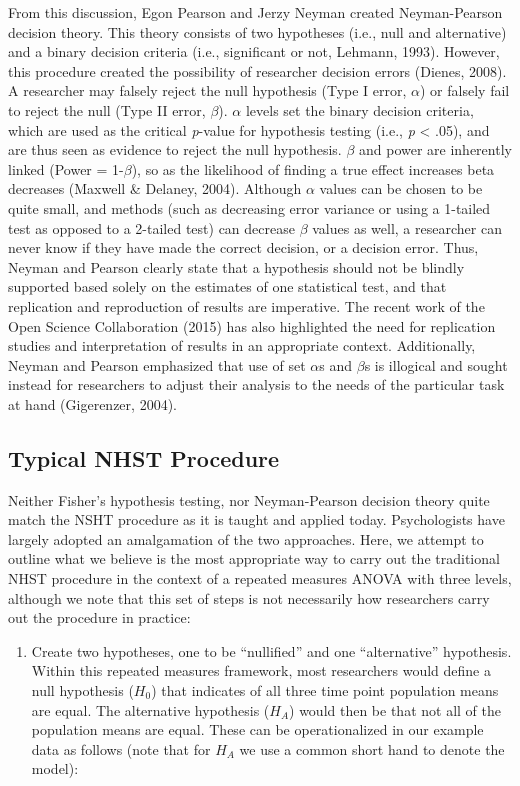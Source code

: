 \documentclass[english,man]{apa6}
\providecommand{\tightlist}{%
  \setlength{\itemsep}{0pt}\setlength{\parskip}{0pt}}
\theoremstyle{definition}
\theoremstyle{definition}
\theoremstyle{definition}
\theoremstyle{remark}
\begin{document}
From this discussion, Egon Pearson and Jerzy Neyman created
Neyman-Pearson decision theory. This theory consists of two hypotheses
(i.e., null and alternative) and a binary decision criteria (i.e.,
significant or not, Lehmann, 1993). However, this procedure created the
possibility of researcher decision errors (Dienes, 2008). A researcher
may falsely reject the null hypothesis (Type I error, \(\alpha\)) or
falsely fail to reject the null (Type II error, \(\beta\)). \(\alpha\)
levels set the binary decision criteria, which are used as the critical
\emph{p}-value for hypothesis testing (i.e., \emph{p} \textless{} .05),
and are thus seen as evidence to reject the null hypothesis. \(\beta\)
and power are inherently linked (Power = 1-\(\beta\)), so as the
likelihood of finding a true effect increases beta decreases (Maxwell \&
Delaney, 2004). Although \(\alpha\) values can be chosen to be quite
small, and methods (such as decreasing error variance or using a
1-tailed test as opposed to a 2-tailed test) can decrease \(\beta\)
values as well, a researcher can never know if they have made the
correct decision, or a decision error. Thus, Neyman and Pearson clearly
state that a hypothesis should not be blindly supported based solely on
the estimates of one statistical test, and that replication and
reproduction of results are imperative. The recent work of the Open
Science Collaboration (2015) has also highlighted the need for
replication studies and interpretation of results in an appropriate
context. Additionally, Neyman and Pearson emphasized that use of set
\(\alpha\)s and \(\beta\)s is illogical and sought instead for
researchers to adjust their analysis to the needs of the particular task
at hand (Gigerenzer, 2004).

\subsection{Typical NHST Procedure}\label{typical-nhst-procedure}

Neither Fisher's hypothesis testing, nor Neyman-Pearson decision theory
quite match the NSHT procedure as it is taught and applied today.
Psychologists have largely adopted an amalgamation of the two
approaches. Here, we attempt to outline what we believe is the most
appropriate way to carry out the traditional NHST procedure in the
context of a repeated measures ANOVA with three levels, although we note
that this set of steps is not necessarily how researchers carry out the
procedure in practice:

\begin{enumerate}
\def\labelenumi{\arabic{enumi})}
\tightlist
\item
  Create two hypotheses, one to be \enquote{nullified} and one
  \enquote{alternative} hypothesis. Within this repeated measures
  framework, most researchers would define a null hypothesis (\(H_0\))
  that indicates of all three time point population means are equal. The
  alternative hypothesis (\(H_A\)) would then be that not all of the
  population means are equal. These can be operationalized in our
  example data as follows (note that for \(H_A\) we use a common short
  hand to denote the model):
\end{enumerate}
\end{document}
